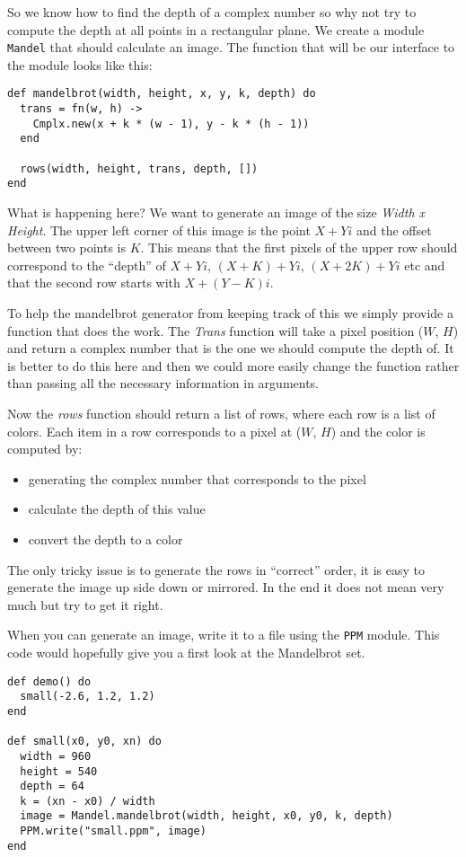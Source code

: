 \documentclass[a4paper,11pt]{article}
\begin{document}
So we know how to find the depth of a complex number so why not try to
compute the depth at all points in a rectangular plane. We create a
module {\tt Mandel} that should calculate an image. The function that
will be our interface to the module looks like this:

\begin{verbatim}
def mandelbrot(width, height, x, y, k, depth) do
  trans = fn(w, h) ->
    Cmplx.new(x + k * (w - 1), y - k * (h - 1))
  end

  rows(width, height, trans, depth, [])
end
\end{verbatim}

What is happening here? We want to generate an image of the size {\em
  Width x Height}. The upper left corner of this image is the point $X
+ Yi$ and the offset between two points is $K$. This means that the
first pixels of the upper row should correspond to the ``depth'' of
$X+Yi$, $(X+K) + Yi$, $(X+2K) + Yi$ etc and that the second row starts
with $X + (Y-K)i$. 

To help the mandelbrot generator from keeping track of this we simply
provide a function that does the work. The {\em Trans} function will
take a pixel position ($W$, $H$) and return a complex number that is
the one we should compute the depth of. It is better to do this here
and then we could more easily change the function rather than passing
all the necessary information in arguments.

Now the {\em rows} function should return a list of rows, where each
row is a list of colors. Each item in a row corresponds to a pixel at
($W$, $H$) and the color is computed by:

\begin{itemize}
 \item generating the complex number that corresponds to the pixel
 \item calculate the depth of this value
 \item convert the depth to a color
\end{itemize}

The only tricky issue is to generate the rows in ``correct'' order, it
is easy to generate the image up side down or mirrored. In the end it
does not mean very much but try to get it right.

When you can generate an image, write it to a file using the {\tt PPM}
module. This code would hopefully give you a first look at the Mandelbrot set.

\begin{verbatim}
def demo() do
  small(-2.6, 1.2, 1.2)
end

def small(x0, y0, xn) do
  width = 960
  height = 540
  depth = 64
  k = (xn - x0) / width
  image = Mandel.mandelbrot(width, height, x0, y0, k, depth)
  PPM.write("small.ppm", image)
end
\end{verbatim}
\end{document}
